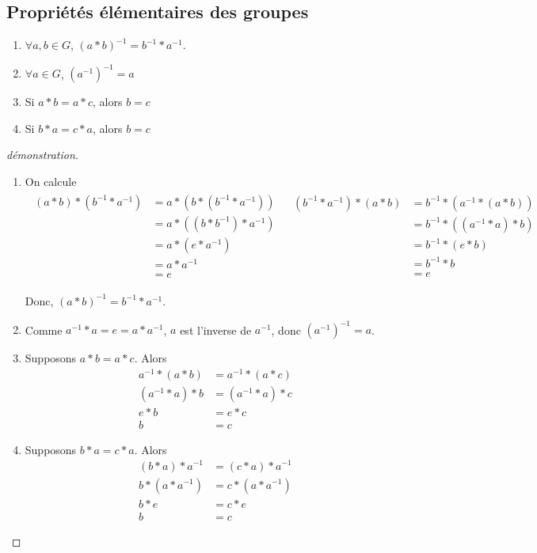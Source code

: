 \documentclass{report}
\theoremstyle{definition}
\theoremstyle{remark}
\begin{document}
	\subsection{Propri\'et\'es \'el\'ementaires des groupes}
	\begin{enumerate}[label=(\alph*)]
		\item $\forall a,b \in G$, $(a*b)^{-1} = b^{-1}*a^{-1}$.
		\item $\forall a \in G$, $(a^{-1})^{-1}=a$
		\item Si $a*b=a*c$, alors $b=c$
		\item Si $b*a=c*a$, alors $b=c$
	\end{enumerate}
	\begin{proof}[d\'emonstration]~

		\begin{enumerate}[label=(\alph*)]
			\item On calcule
			\begin{align*}
				\begin{split}
					(a*b)*(b^{-1}*a^{-1})&= a*(b*(b^{-1}*a^{-1}))\\
					&= a*((b*b^{-1})*a^{-1})\\
					&= a*(e*a^{-1})\\
					&= a*a^{-1}\\
					&= e
				\end{split}
				&
				\begin{split}
					(b^{-1}*a^{-1})*(a*b)&= b^{-1}*(a^{-1}*(a*b))\\
					&= b^{-1}*((a^{-1}*a)*b)\\
					&= b^{-1}*(e*b)\\
					&= b^{-1}*b\\
					&= e
				\end{split}
			\end{align*}

			Donc, $(a*b)^{-1} = b^{-1}*a^{-1}$.
			\item Comme $a^{-1}*a=e=a*a^{-1}$, $a$ est l'inverse de $a^{-1}$, donc $\left( a^{-1} \right)^{-1}=a$.
			\item Supposons $a*b=a*c$. Alors
			\begin{align*}
				a^{-1}*(a*b)&= a^{-1}*(a*c)\\
				(a^{-1}*a)*b&= (a^{-1}*a)*c\\
				e*b&= e*c\\
				b&= c
			\end{align*}
			\item Supposons $b*a=c*a$. Alors
			\begin{align*}
				(b*a)*a^{-1}&= (c*a)*a^{-1}\\
				b*(a*a^{-1})&= c*(a*a^{-1})\\
				b*e&= c*e\\
				b&= c
			\end{align*}
		\end{enumerate}
	\end{proof}
\end{document}
